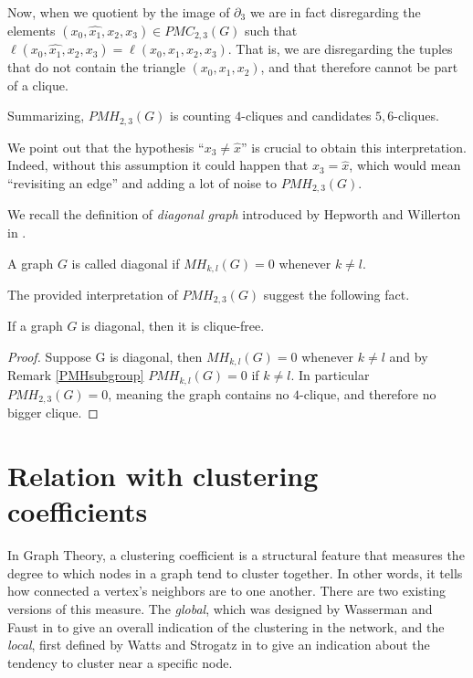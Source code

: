 \documentclass[runningheads]{llncs}
\begin{document}
Now, when we quotient by the image of $\partial_3$ we are in fact disregarding the elements $(x_0,\hat{x_1},x_2,x_3) \in PMC_{2,3}(G)$ such that $\ell(x_0,\hat{x_1},x_2,x_3)=\ell(x_0,x_1,x_2,x_3)$. That is, we are disregarding the tuples that do not contain the triangle $(x_0,x_1,x_2)$, and that therefore cannot be part of a clique.

Summarizing, $PMH_{2,3}(G)$ is counting $4$-cliques and candidates $5,6$-cliques.

\begin{remark}
We point out that the hypothesis ``$x_3 \neq \hat{x}$'' is crucial to obtain this interpretation. 
Indeed, without this assumption it could happen that $x_3 = \hat{x}$, which would mean ``revisiting an edge'' and adding a lot of noise to $PMH_{2,3}(G)$.
\end{remark}

We recall the definition of \emph{diagonal graph} introduced by Hepworth and Willerton in \cite{hepworth2015categorifying}.

\begin{definition}
A graph $G$ is called diagonal if $MH_{k,l}(G) = 0$ whenever $k \neq l$.
\end{definition}

The provided interpretation of $PMH_{2,3}(G)$ suggest the following fact.

\begin{proposition}
If a graph $G$ is diagonal, then it is clique-free.
\end{proposition}

\begin{proof}
Suppose G is diagonal, then $MH_{k,l}(G) = 0$ whenever $k \neq l$ and by Remark \ref{PMHsubgroup} $PMH_{k,l}(G)=0$ if $k \neq l$. 
In particular $PMH_{2,3}(G)=0$, meaning the graph contains no $4$-clique, and therefore no bigger clique.
\end{proof}

\section{Relation with clustering coefficients}

In Graph Theory, a clustering coefficient is a structural feature that measures the degree to which nodes in a graph tend to cluster together.
In other words, it tells how connected a vertex’s neighbors are to one another.
There are two existing versions of this measure.
The \emph{global}, which was designed by Wasserman and Faust in \cite{wasserman1994social} to give an overall indication of the clustering in the network, and the \emph{local}, first defined by Watts and Strogatz in \cite{watts1998collective} to give an indication about the tendency to cluster near a specific node.
\end{document}
